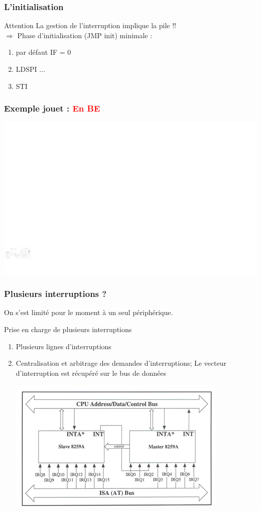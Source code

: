 \documentclass{beamer}
\begin{document}
\begin{frame}
\frametitle{L'initialisation}

\begin{block}{Attention}
La gestion de l'interruption implique la pile !!\\
$\Rightarrow$ Phase d'initialisation (JMP init) minimale :
\begin{enumerate}
\item par défaut IF = 0
\item LDSPI ...
\item STI
\end{enumerate}
\end{block}

\end{frame}

\begin{frame}
\frametitle{Exemple jouet : \textcolor{red}{En BE}}

\includegraphics[width=\linewidth]{Figs/premier_chemin_seq_irq_bouton.pdf}

\end{frame}

\begin{frame}
\frametitle{Plusieurs interruptions ?}

On s'est limité pour le moment à un seul périphérique.
\begin{block}{Prise en charge de plusieurs interruptions}
\begin{enumerate}
\item Plusieurs lignes d'interruptions
\item Centralisation et arbitrage des demandes d'interruptions; Le vecteur d'interruption est récupéré sur le bus de données

\centering\includegraphics[width=0.6\linewidth]{Figs/8259.png}

\end{enumerate}
\end{block}
\end{frame}
\end{document}
